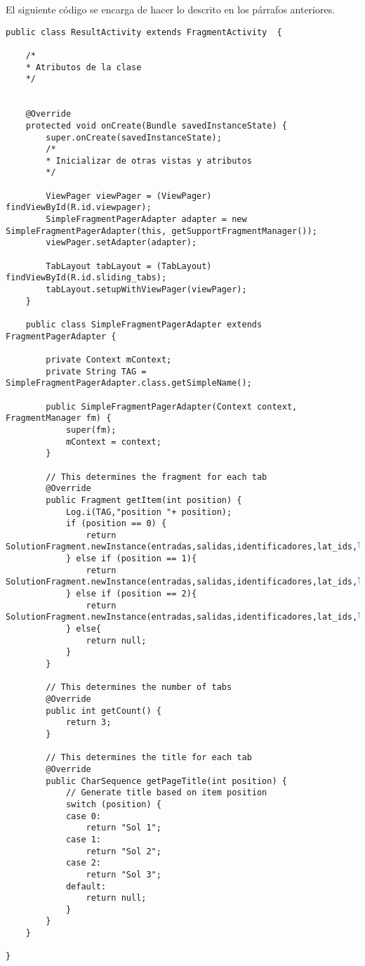 El siguiente código se encarga de hacer lo descrito en los párrafos anteriores.
\begin{lstlisting}[caption=Código de una vista con tabs dentro de ella.]
public class ResultActivity extends FragmentActivity  {

	/*
	* Atributos de la clase
	*/
	
	
	@Override
	protected void onCreate(Bundle savedInstanceState) {
		super.onCreate(savedInstanceState);
		/*
		* Inicializar de otras vistas y atributos
		*/
		
		ViewPager viewPager = (ViewPager) findViewById(R.id.viewpager);
		SimpleFragmentPagerAdapter adapter = new SimpleFragmentPagerAdapter(this, getSupportFragmentManager());
		viewPager.setAdapter(adapter);
		
		TabLayout tabLayout = (TabLayout) findViewById(R.id.sliding_tabs);
		tabLayout.setupWithViewPager(viewPager);
	}
	
	public class SimpleFragmentPagerAdapter extends FragmentPagerAdapter {
	
		private Context mContext;
		private String TAG = SimpleFragmentPagerAdapter.class.getSimpleName();
		
		public SimpleFragmentPagerAdapter(Context context, FragmentManager fm) {
			super(fm);
			mContext = context;
		}
		
		// This determines the fragment for each tab
		@Override
		public Fragment getItem(int position) {
			Log.i(TAG,"position "+ position);
			if (position == 0) {
				return SolutionFragment.newInstance(entradas,salidas,identificadores,lat_ids,lon_ids,lat_city,lon_city);
			} else if (position == 1){
				return SolutionFragment.newInstance(entradas,salidas,identificadores,lat_ids,lon_ids,lat_city,lon_city);
			} else if (position == 2){
				return SolutionFragment.newInstance(entradas,salidas,identificadores,lat_ids,lon_ids,lat_city,lon_city);
			} else{
				return null;
			}
		}
		
		// This determines the number of tabs
		@Override
		public int getCount() {
			return 3;
		}
		
		// This determines the title for each tab
		@Override
		public CharSequence getPageTitle(int position) {
			// Generate title based on item position
			switch (position) {
			case 0:
				return "Sol 1";
			case 1:
				return "Sol 2";
			case 2:
				return "Sol 3";
			default:
				return null;
			}
		}
	}

}
\end{lstlisting}
